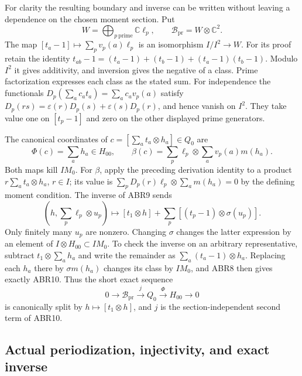 \documentclass[11pt]{article}
\begin{document}
For clarity the resulting boundary and inverse can be written
without leaving a dependence on the chosen moment section. Put
\begin{equation}\tag{ABR8}
 W=\bigoplus_{p\ \mathrm{prime}}\mathbb C\ell_p,
 \qquad \mathcal B_{\mathrm{pr}}=W\otimes\mathbb C^2.
\end{equation}
The map $[t_a-1]\mapsto\sum_pv_p(a)\ell_p$ is an isomorphism
$I/I^2\to W$. For its proof retain the identity
$t_{ab}-1=(t_a-1)+(t_b-1)+(t_a-1)(t_b-1)$.
Modulo $I^2$ it gives additivity, and inversion gives the negative
of a class. Prime factorization expresses each class as the stated
sum. For independence the functionals
$D_p(\sum_ac_at_a)=\sum_ac_av_p(a)$ satisfy
$D_p(rs)=\varepsilon(r)D_p(s)+\varepsilon(s)D_p(r)$, and hence
vanish on $I^2$. They take value one on $[t_p-1]$ and zero on
the other displayed prime generators.

The canonical coordinates of $c=[\sum_at_a\otimes h_a]\in Q_0$
are
\begin{equation}\tag{ABR9}
 \Phi(c)=\sum_a h_a\in H_{00},\qquad
 \beta(c)=\sum_p\ell_p\otimes\sum_a v_p(a)m(h_a).
\end{equation}
Both maps kill $IM_0$. For $\beta$, apply the preceding derivation
identity to a product $r\sum_at_a\otimes h_a$, $r\in I$;
its value is $\sum_pD_p(r)\ell_p\otimes\sum_am(h_a)=0$ by
the defining moment condition. The inverse of ABR9 sends
\begin{equation}\tag{ABR10}
 (h,\sum_p\ell_p\otimes u_p)
 \longmapsto [t_1\otimes h]
             +\sum_p[(t_p-1)\otimes\sigma(u_p)].
\end{equation}
Only finitely many $u_p$ are nonzero. Changing $\sigma$ changes
the latter expression by an element of $I\otimes H_{00}\subset IM_0$.
To check the inverse on an arbitrary representative, subtract
$t_1\otimes\sum_a h_a$ and write the remainder as
$\sum_a(t_a-1)\otimes h_a$. Replacing each $h_a$ there by
$\sigma m(h_a)$ changes its class by $IM_0$, and ABR8 then
gives exactly ABR10. Thus the short exact sequence
\begin{equation}\tag{ABR11}
 0\longrightarrow\mathcal B_{\mathrm{pr}}
   \xrightarrow{\ j\ }Q_0\xrightarrow{\Phi}H_{00}
   \longrightarrow0
\end{equation}
is canonically split by $h\mapsto[t_1\otimes h]$, and $j$ is
the section-independent second term of ABR10.

\subsection{Actual periodization, injectivity, and exact inverse}
\end{document}
